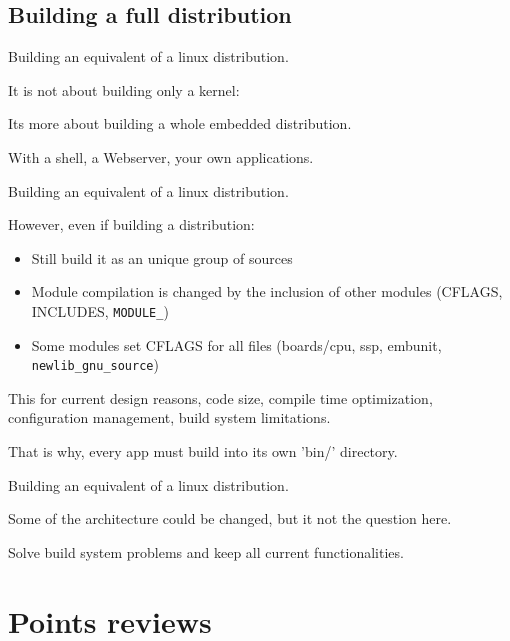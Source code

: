 \documentclass[ucs,9pt]{beamer}
\begin{document}
\subsection{Building a full distribution}

\begin{frame}{Building an equivalent of a linux distribution.}

  It is not about building only a kernel:

  \bigskip
  Its more about building a whole embedded distribution.

  \bigskip
  With a shell, a Webserver, your own applications.

\end{frame}


\begin{frame}{Building an equivalent of a linux distribution.}

  However, even if building a distribution:

  \begin{itemize}
    \item
      Still build it as an unique group of sources

    \item
      Module compilation is changed by the inclusion of other modules
      (CFLAGS, INCLUDES, \texttt{MODULE\_})

    \item
      Some modules set CFLAGS for all files (boards/cpu, ssp, embunit, \texttt{newlib\_gnu\_source})
  \end{itemize}

  \pause
  This for current design reasons, code size, compile time optimization,
  configuration management, build system limitations.

  \bigskip
  That is why, every app must build into its own 'bin/' directory.

\end{frame}


\begin{frame}{Building an equivalent of a linux distribution.}

  Some of the architecture could be changed, but it not the question here.

  \bigskip
  Solve build system problems and keep all current functionalities.

\end{frame}


\section{Points reviews}
\end{document}
